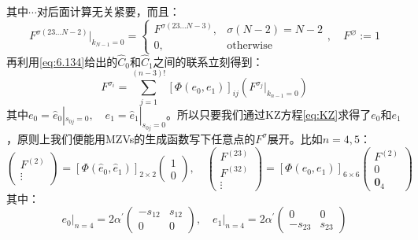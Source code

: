 其中$\cdots$对后面计算无关紧要，而且：
\begin{equation}
	F^{\sigma{(23\ldots N-2)}}|_{k_{N-1}=0}=\begin{cases}F^{\sigma{(23\ldots N-3)}},&\sigma(N-2)=N-2\\0,&\text{otherwise}\end{cases},\quad F^\varnothing :=1
\end{equation}
再利用\ref{eq:6.134}给出的$\hat C_0$和$\hat C_1$之间的联系立刻得到：
\begin{equation}
	F^{\sigma_i}=\sum_{j=1}^{(n-3)!}\left[\Phi(e_0,e_1)\right]_{ij}\left(F^{\sigma_j}|_{k_{n-1}=0}\right)
\end{equation}
其中$e_0=\hat{e}_0\left|_{s_{0j}=0},\quad e_1=\hat{e}_1\right|_{s_{0j}=0}$。所以只要我们通过KZ方程\ref{eq:KZ}求得了$e_0$和$e_1$，原则上我们便能用MZVs的生成函数写下任意点的$F^\sigma$展开。比如$n=4,5$：
\begin{equation}
	\begin{pmatrix} 
		F^{(2)} \\ 
		\vdots 
	\end{pmatrix}
	= [\Phi(\hat{e}_{0},\hat{e}_{1})]_{2\times2}
	\begin{pmatrix} 
		1 \\ 
		0 
	\end{pmatrix},\quad  \begin{pmatrix}F^{(23)}\\F^{(32)}\\\vdots\end{pmatrix}=[\Phi(e_0,e_1)]_{6\times6}\begin{pmatrix}F^{(2)}\\0\\\mathbf{0}_4\end{pmatrix}
\end{equation}
其中：
\begin{equation}
	\left.e_0\right|_{n=4}=2\alpha^{\prime}\begin{pmatrix}-s_{12}&s_{12}\\0&0\end{pmatrix},\quad e_1|_{n=4}=2\alpha^{\prime}\begin{pmatrix}0&0\\-s_{23}&s_{23}\end{pmatrix}
\end{equation}
